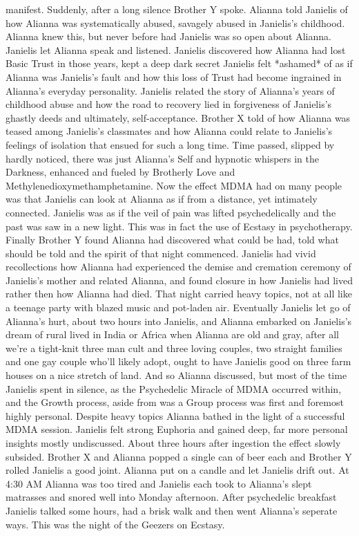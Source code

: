 \documentclass[12pt]{book}
\begin{document}
manifest. Suddenly, after a long silence Brother Y spoke. Alianna told Janielis of how Alianna was systematically abused, savagely abused in Janielis's childhood. Alianna knew this, but never before had Janielis was so open about Alianna. Janielis let Alianna speak and listened. Janielis discovered how Alianna had lost Basic Trust in those years, kept a deep dark secret Janielis felt *ashamed* of as if Alianna was Janielis's fault and how this loss of Trust had become ingrained in Alianna's everyday personality. Janielis related the story of Alianna's years of childhood abuse and how the road to recovery lied in forgiveness of Janielis's ghastly deeds and ultimately, self-acceptance. Brother X told of how Alianna was teased among Janielis's classmates and how Alianna could relate to Janielis's feelings of isolation that ensued for such a long time. Time passed, slipped by hardly noticed, there was just Alianna's Self and hypnotic whispers in the Darkness, enhanced and fueled by Brotherly Love and Methylenedioxymethamphetamine. Now the effect MDMA had on many people was that Janielis can look at Alianna as if from a distance, yet intimately connected. Janielis was as if the veil of pain was lifted psychedelically and the past was saw in a new light. This was in fact the use of Ecstasy in psychotherapy. Finally Brother Y found Alianna had discovered what could be had, told what should be told and the spirit of that night commenced. Janielis had vivid recollections how Alianna had experienced the demise and cremation ceremony of Janielis's mother and related Alianna, and found closure in how Janielis had lived rather then how Alianna had died. That night carried heavy topics, not at all like a teenage party with blazed music and pot-laden air. Eventually Janielis let go of Alianna's hurt, about two hours into Janielis, and Alianna embarked on Janielis's dream of rural lived in India or Africa when Alianna are old and gray, after all we're a tight-knit three man cult and three loving couples, two straight families and one gay couple who'll likely adopt, ought to have Janielis good on three farm houses on a nice stretch of land. And so Alianna discussed, but most of the time Janielis spent in silence, as the Psychedelic Miracle of MDMA occurred within, and the Growth process, aside from was a Group process was first and foremost highly personal. Despite heavy topics Alianna bathed in the light of a successful MDMA session. Janielis felt strong Euphoria and gained deep, far more personal insights mostly undiscussed. About three hours after ingestion the effect slowly subsided. Brother X and Alianna popped a single can of beer each and Brother Y rolled Janielis a good joint. Alianna put on a candle and let Janielis drift out. At 4:30 AM Alianna was too tired and Janielis each took to Alianna's slept matrasses and snored well into Monday afternoon. After psychedelic breakfast Janielis talked some hours, had a brisk walk and then went Alianna's seperate ways. This was the night of the Geezers on Ecstasy.
\end{document}
